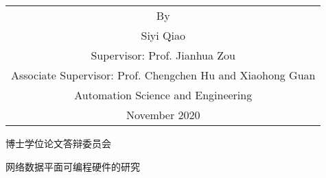 \begin{titlepage}
\begin{center}
		\vspace{3cm}
		{\sanhao
			\begin{center} \renewcommand{\arraystretch}{1.5}
				\begin{tabular}{c}
					By \\
					Siyi Qiao \\
					Supervisor: Prof. Jianhua Zou \\
					Associate Supervisor: Prof. Chengchen Hu and Xiaohong Guan \\%
					Automation Science and Engineering \\
					November 2020 \\ %
				\end{tabular} \renewcommand{\arraystretch}{1}
			\end{center} 
		}
	\end{center}
	\clearpage{\pagestyle{empty}\cleardoublepage}
	
	\newpage\thispagestyle{empty}
	\begin{center}
		\parbox[t][0.7cm][t]{\textwidth}{}
		
		\begin{center}{\boldsong 博士学位论文答辩委员会}\end{center}
		
		\vspace{1cm}
		\begin{center}{\boldsong 网络数据平面可编程硬件的研究}\end{center}
		

\end{center}
\end{titlepage}
